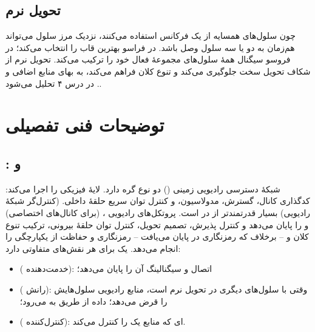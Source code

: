 \documentclass[11pt,a4paper]{article}
\begin{document}
\subsection{تحویل نرم}
چون سلول‌های همسایه از یک فرکانس استفاده می‌کنند،  نزدیک مرز سلول می‌تواند هم‌زمان به
دو یا سه سلول وصل باشد. در فراسو  بهترین قاب را انتخاب می‌کند؛ در فروسو 
سیگنال همهٔ سلول‌های مجموعهٔ فعال خود را ترکیب می‌کند. تحویل نرم از شکاف تحویل سخت جلوگیری
می‌کند و تنوع کلان فراهم می‌کند، به بهای منابع اضافی  و . در درس ۴ تحلیل می‌شود.

\section{توضیحات فنی تفصیلی}

\subsection{:  و }
شبکهٔ دسترسی رادیویی زمینی  () \cite{ts25401} دو نوع گره دارد.
\textbf{} لایهٔ فیزیکی را اجرا می‌کند: کدگذاری کانال، گسترش، مدولاسیون،  و کنترل
توان سریع حلقهٔ داخلی. \textbf{} (کنترل‌گر شبکهٔ رادیویی) بسیار قدرتمندتر از 
در  است. پروتکل‌های رادیویی ،  (برای کانال‌های اختصاصی) و 
را پایان می‌دهد و کنترل پذیرش، تصمیم تحویل، کنترل توان حلقهٔ بیرونی، ترکیب تنوع کلان و --
برخلاف  که رمزنگاری در  پایان می‌یافت -- رمزنگاری و حفاظت از یکپارچگی را
انجام می‌دهد. یک  برای هر  نقش‌های متفاوتی دارد:
\begin{itemize}
  \item \textbf{} ( خدمت‌دهنده): اتصال  و سیگنالینگ  آن
         را پایان می‌دهد؛
  \item \textbf{} ( رانش): وقتی  با سلول‌های  دیگری در تحویل
        نرم است، منابع رادیویی سلول‌هایش را قرض می‌دهد؛ داده از طریق  به  می‌رود؛
  \item \textbf{} ( کنترل‌کننده): ای که منابع یک  را کنترل می‌کند.
\end{itemize}
\end{document}
